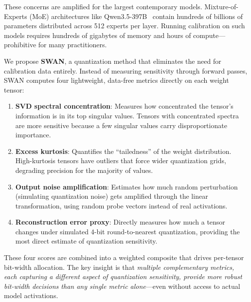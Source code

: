 \documentclass{article}
\begin{document}
These concerns are amplified for the largest contemporary models. Mixture-of-Experts (MoE) architectures like Qwen3.5-397B~\cite{qwen3.5} contain hundreds of billions of parameters distributed across 512 experts per layer. Running calibration on such models requires hundreds of gigabytes of memory and hours of compute---prohibitive for many practitioners.

We propose \textbf{SWAN}, a quantization method that eliminates the need for calibration data entirely. Instead of measuring sensitivity through forward passes, SWAN computes four lightweight, data-free metrics directly on each weight tensor:
\begin{enumerate}
    \item \textbf{SVD spectral concentration}: Measures how concentrated the tensor's information is in its top singular values. Tensors with concentrated spectra are more sensitive because a few singular values carry disproportionate importance.
    \item \textbf{Excess kurtosis}: Quantifies the ``tailedness'' of the weight distribution. High-kurtosis tensors have outliers that force wider quantization grids, degrading precision for the majority of values.
    \item \textbf{Output noise amplification}: Estimates how much random perturbation (simulating quantization noise) gets amplified through the linear transformation, using random probe vectors instead of real activations.
    \item \textbf{Reconstruction error proxy}: Directly measures how much a tensor changes under simulated 4-bit round-to-nearest quantization, providing the most direct estimate of quantization sensitivity.
\end{enumerate}

These four scores are combined into a weighted composite that drives per-tensor bit-width allocation. The key insight is that \emph{multiple complementary metrics, each capturing a different aspect of quantization sensitivity, provide more robust bit-width decisions than any single metric alone}---even without access to actual model activations.
\end{document}
